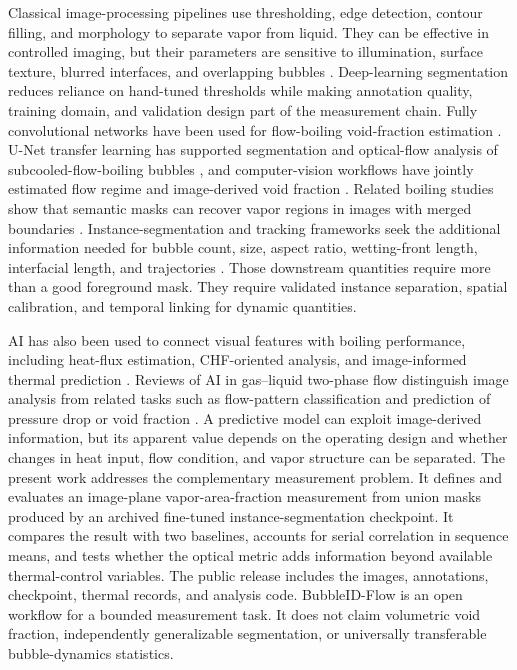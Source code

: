 \documentclass[preprint,12pt,sort&compress]{elsarticle}
\begin{document}
Classical image-processing pipelines use thresholding, edge detection, contour filling, and morphology to separate vapor from liquid. They can be effective in controlled imaging, but their parameters are sensitive to illumination, surface texture, blurred interfaces, and overlapping bubbles \cite{Chu2021,Schepperle2024FlowRegimes}. Deep-learning segmentation reduces reliance on hand-tuned thresholds while making annotation quality, training domain, and validation design part of the measurement chain. Fully convolutional networks have been used for flow-boiling void-fraction estimation \cite{Chu2021}. U-Net transfer learning has supported segmentation and optical-flow analysis of subcooled-flow-boiling bubbles \cite{Seong2023Automated}, and computer-vision workflows have jointly estimated flow regime and image-derived void fraction \cite{Schepperle2024FlowRegimes}. Related boiling studies show that semantic masks can recover vapor regions in images with merged boundaries \cite{Soibam2023Segmentation,Malakhov2023DeepLearning}. Instance-segmentation and tracking frameworks seek the additional information needed for bubble count, size, aspect ratio, wetting-front length, interfacial length, and trajectories \cite{Chang2023BubbleMask,Suh2024VISIONiT,Dunlap2024BubbleID,Moiz2025BubbleDynamics}. Those downstream quantities require more than a good foreground mask. They require validated instance separation, spatial calibration, and temporal linking for dynamic quantities.

AI has also been used to connect visual features with boiling performance, including heat-flux estimation, CHF-oriented analysis, and image-informed thermal prediction \cite{Chang2023BubbleMask,Huang2024BoilingPrediction,Comelli2024Image,Na2025Thermal,Naderi2026LargeScale}. Reviews of AI in gas--liquid two-phase flow distinguish image analysis from related tasks such as flow-pattern classification and prediction of pressure drop or void fraction \cite{Miwa2022TwoPhaseVision,Qiu2025MLReview}. A predictive model can exploit image-derived information, but its apparent value depends on the operating design and whether changes in heat input, flow condition, and vapor structure can be separated. The present work addresses the complementary measurement problem. It defines and evaluates an image-plane vapor-area-fraction measurement from union masks produced by an archived fine-tuned instance-segmentation checkpoint. It compares the result with two baselines, accounts for serial correlation in sequence means, and tests whether the optical metric adds information beyond available thermal-control variables. The public release includes the images, annotations, checkpoint, thermal records, and analysis code. BubbleID-Flow is an open workflow for a bounded measurement task. It does not claim volumetric void fraction, independently generalizable segmentation, or universally transferable bubble-dynamics statistics.
\end{document}
